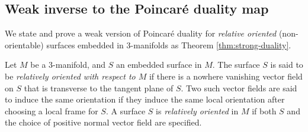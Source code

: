 \subsection{Weak inverse to the Poincar\'e duality map}
\label{sec:weak-inverse-poinc}

We state and prove a weak version of Poincar\'e duality for {\it relative oriented} (non-orientable) surfaces embedded in 3-manifolds as Theorem \ref{thm:strong-duality}.

  Let $M$ be a $3$-manifold, and $S$ an embedded surface in $M$.
  The surface $S$ is said to be \emph{relatively oriented with respect to $M$} if there is a nowhere vanishing vector field on $S$ that is transverse to the tangent plane of $S$.
  Two such vector fields are said to induce the same orientation if they induce the same local orientation after choosing a local frame for $S$.
  A surface $S$ is \emph{relatively oriented} in $M$ if both $S$ and the choice of positive normal vector field are specified.

